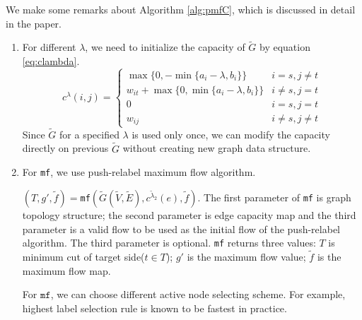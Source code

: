 \documentclass{article}
\begin{document}
We make some remarks about Algorithm \ref{alg:pmfC}, which is discussed in detail in the paper.
\begin{enumerate}
\item For different $\lambda$, we need to initialize the capacity of $\widetilde{G}$ by equation \eqref{eq:clambda}.
\begin{equation}\label{eq:clambda}
c^{\lambda}(i, j) = 
\begin{cases}
\max\{0, -\min\{a_i-\lambda, b_i\}\} &  i = s, j \neq t \\
w_{it} + \max\{0, \min\{a_i - \lambda, b_i\}\} & i\neq s, j = t\\
0 & i = s, j = t\\
w_{ij} & i \neq s, j \neq t
\end{cases}
\end{equation}
Since $\widetilde{G}$ for a specified $\lambda$ is used only once, we can modify the capacity directly on previous $\widetilde{G}$ without creating new graph data structure.

\item For \texttt{mf}, we use push-relabel maximum flow algorithm\cite{Goldberg}.

 $(T,g',\tilde{f})=$\texttt{mf}$(\widetilde{G}(\widetilde{V}, \widetilde{E}), c^{\tilde{\lambda}_2}(e), \tilde{f})$. The first parameter of \texttt{mf} is graph topology structure; the second parameter is edge capacity map and the third parameter is a valid flow to be used as the initial flow of the push-relabel algorithm. The third parameter is optional. \texttt{mf} returns three values: $T$ is minimum cut of target side($t\in T$); $g'$ is the maximum flow value; $\tilde{f}$ is the maximum flow map.

For $\texttt{mf}$, we can choose different active node selecting scheme. For example, highest label selection rule is known to be fastest in practice.


\end{enumerate}
\end{document}
